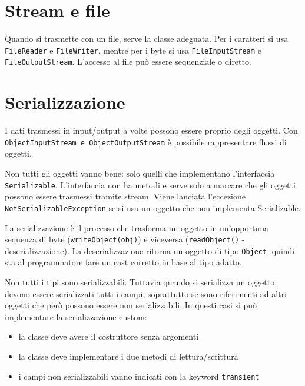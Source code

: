 \section{Stream e file}
Quando si trasmette con un file, serve la classe adeguata. Per i caratteri si usa \texttt{FileReader} e \texttt{FileWriter}, mentre per i byte si usa \texttt{FileInputStream} e \texttt{FileOutputStream}.
L'accesso al file può essere sequenziale o diretto.

\section{Serializzazione}
I dati trasmessi in input/output a volte possono essere proprio degli oggetti. Con \texttt{ObjectInputStream e ObjectOutputStream} è possibile rappresentare flussi di oggetti. 

Non tutti gli oggetti vanno bene: solo quelli che implementano l'interfaccia \texttt{Serializable}. L'interfaccia non ha metodi e serve solo a marcare che gli oggetti possono essere trasmessi tramite stream. Viene lanciata l'eccezione \texttt{NotSerializableException} se si usa un oggetto che non implementa Serializable.

La serializzazione è il processo che trasforma un oggetto in un'opportuna sequenza di byte (\texttt{writeObject(obj)}) e viceversa (\texttt{readObject()} - deserializzazione). La deserializzazione ritorna un oggetto di tipo \texttt{Object}, quindi sta al programmatore fare un cast corretto in base al tipo adatto. 

Non tutti i tipi sono serializzabili. Tuttavia quando si serializza un oggetto, devono essere serializzati tutti i campi, soprattutto se sono riferimenti ad altri oggetti che però possono essere non serializzabili. In questi casi si può implementare la serializzazione custom:
\begin{itemize}
\item la classe deve avere il costruttore senza argomenti
\item la classe deve implementare i due metodi di lettura/scrittura
\item i campi non serializzabili vanno indicati con la keyword \texttt{transient}
\end{itemize}

